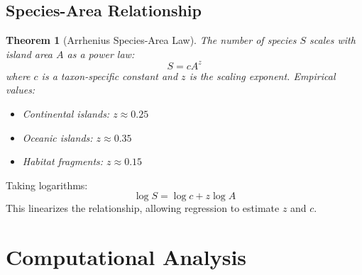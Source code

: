 \documentclass[a4paper, 11pt]{article}
\newtheorem{theorem}{Theorem}[section]
\begin{document}
\subsection{Species-Area Relationship}

\begin{theorem}[Arrhenius Species-Area Law]
The number of species $S$ scales with island area $A$ as a power law:
\begin{equation}
S = cA^z
\end{equation}
where $c$ is a taxon-specific constant and $z$ is the scaling exponent. Empirical values:
\begin{itemize}
\item Continental islands: $z \approx 0.25$
\item Oceanic islands: $z \approx 0.35$
\item Habitat fragments: $z \approx 0.15$
\end{itemize}
\end{theorem}

Taking logarithms:
\begin{equation}
\log S = \log c + z \log A
\end{equation}
This linearizes the relationship, allowing regression to estimate $z$ and $c$.

\section{Computational Analysis}
\end{document}
